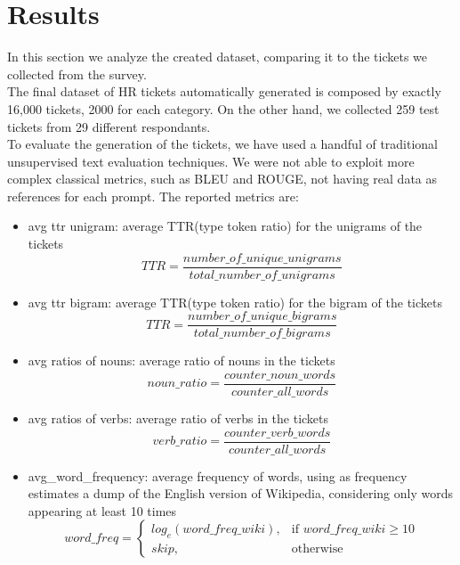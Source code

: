 \section{Results}
In this section we analyze the created dataset, comparing it to the tickets we collected from the survey. \\
The final dataset of HR tickets automatically generated is composed by exactly 16,000 tickets, 2000 for each category. On the other hand, we collected 259 test tickets from 29 different respondants. \\
To evaluate the generation of the tickets, we have used a handful of traditional unsupervised text evaluation techniques. We were not able to exploit more complex classical metrics, such as BLEU and ROUGE, not having real data as references for each prompt.
The reported metrics are:
\begin{itemize}
    \item avg ttr unigram: average TTR(type token ratio) for the unigrams of the tickets\\ 
    \begin{equation*}
        TTR = \frac{number\_of\_unique\_unigrams}{total\_number\_of\_unigrams}
    \end{equation*}
    \item avg ttr bigram: average TTR(type token ratio) for the bigram of the tickets\\ 
    \begin{equation*}
        TTR = \frac{number\_of\_unique\_bigrams}{total\_number\_of\_bigrams}
    \end{equation*}
    \item avg ratios of nouns: average ratio of nouns in the tickets\\
    \begin{equation*}
        noun\_ratio = \frac{counter\_noun\_words}{counter\_all\_words}
    \end{equation*}
    \item avg ratios of verbs: average ratio of verbs in the tickets\\
    \begin{equation*}
        verb\_ratio = \frac{counter\_verb\_words}{counter\_all\_words}
    \end{equation*}
    \item avg\_word\_frequency: average frequency of words, using as frequency estimates a dump of the English version of Wikipedia, considering only words appearing at least 10 times\\
    \begin{equation*}
        word\_freq= 
        \begin{cases}
            log_{e}(word\_freq\_wiki),& \text{if } word\_freq\_wiki\geq 10\\
            skip,                   & \text{otherwise}
        \end{cases}
    \end{equation*}
\end{itemize}
